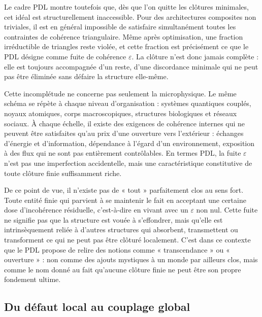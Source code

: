 \documentclass[11pt,a4paper]{article}
\theoremstyle{definition}
\begin{document}
Le cadre PDL montre toutefois que, dès que l’on quitte les clôtures minimales, cet idéal est structurellement inaccessible. Pour des architectures composites non triviales, il est en général impossible de satisfaire simultanément toutes les contraintes de cohérence triangulaire. Même après optimisation, une fraction irréductible de triangles reste violée, et cette fraction est précisément ce que le PDL désigne comme fuite de cohérence \(\varepsilon\).\cite{Laubscher_Leakage_Probability_2024,Laubscher_Exponent18_v2_2024} La clôture n’est donc jamais complète : elle est toujours accompagnée d’un reste, d’une discordance minimale qui ne peut pas être éliminée sans défaire la structure elle-même.

Cette incomplétude ne concerne pas seulement la microphysique. Le même schéma se répète à chaque niveau d’organisation : systèmes quantiques couplés, noyaux atomiques, corps macroscopiques, structures biologiques et réseaux sociaux. À chaque échelle, il existe des exigences de cohérence internes qui ne peuvent être satisfaites qu’au prix d’une ouverture vers l’extérieur : échanges d’énergie et d’information, dépendance à l’égard d’un environnement, exposition à des flux qui ne sont pas entièrement contrôlables.\cite{Laubscher_UniversalCoherenceLeakage_2024,Laubscher_EffectiveFields_2024} En termes PDL, la fuite \(\varepsilon\) n’est pas une imperfection accidentelle, mais une caractéristique constitutive de toute clôture finie suffisamment riche.

De ce point de vue, il n’existe pas de « tout » parfaitement clos au sens fort. Toute entité finie qui parvient à se maintenir le fait en acceptant une certaine dose d’incohérence résiduelle, c’est-à-dire en vivant avec un \(\varepsilon\) non nul. Cette fuite ne signifie pas que la structure est vouée à s’effondrer, mais qu’elle est intrinsèquement reliée à d’autres structures qui absorbent, transmettent ou transforment ce qui ne peut pas être clôturé localement. C’est dans ce contexte que le PDL propose de relire des notions comme « transcendance » ou « ouverture » : non comme des ajouts mystiques à un monde par ailleurs clos, mais comme le nom donné au fait qu’aucune clôture finie ne peut être son propre fondement ultime.\cite{Laubscher_Existence_PulsatingClosure_2026,Laubscher_PDL_TO_Dialogue_2024}

\subsection{Du défaut local au couplage global}
\end{document}
